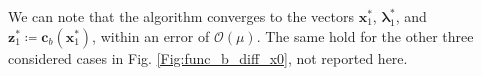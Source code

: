 \documentclass[a4paper,11pt]{article}
\begin{document}
\noindent We can note that the algorithm converges to the vectors $\textbf{x}_{1}^*$, $\boldsymbol{\lambda}_{1}^*$, and $\textbf{z}_{1}^* \coloneqq \textbf{c}_{b}(\textbf{x}_{1}^*)$, within an error of $\mathcal{O}(\mu)$. The same hold for the other three considered cases in Fig. \ref{Fig:func_b_diff_x0}, not reported here.
\begin{figure}[H]
	\centering
	 \
	 \\

\end{figure}
\end{document}
